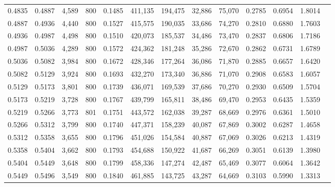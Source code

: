 \begin{tabular}{rrrrrrrrrrrrr}
0.4835 & 0.4887 &  4,589 &   800 &                                     0.1485 & 411,135 & 194,475 &  32,886 &  75,070 & 0.2785 & 0.6954 & 1.8014 \\
0.4887 & 0.4936 &  4,440 &   800 &                                     0.1527 & 415,575 & 190,035 &  33,686 &  74,270 & 0.2810 & 0.6880 & 1.7603 \\
0.4936 & 0.4987 &  4,498 &   800 &                                     0.1510 & 420,073 & 185,537 &  34,486 &  73,470 & 0.2837 & 0.6806 & 1.7186 \\
0.4987 & 0.5036 &  4,289 &   800 &                                     0.1572 & 424,362 & 181,248 &  35,286 &  72,670 & 0.2862 & 0.6731 & 1.6789 \\
0.5036 & 0.5082 &  3,984 &   800 &                                     0.1672 & 428,346 & 177,264 &  36,086 &  71,870 & 0.2885 & 0.6657 & 1.6420 \\
0.5082 & 0.5129 &  3,924 &   800 &                                     0.1693 & 432,270 & 173,340 &  36,886 &  71,070 & 0.2908 & 0.6583 & 1.6057 \\
0.5129 & 0.5173 &  3,801 &   800 &                                     0.1739 & 436,071 & 169,539 &  37,686 &  70,270 & 0.2930 & 0.6509 & 1.5704 \\
0.5173 & 0.5219 &  3,728 &   800 &                                     0.1767 & 439,799 & 165,811 &  38,486 &  69,470 & 0.2953 & 0.6435 & 1.5359 \\
0.5219 & 0.5266 &  3,773 &   801 &                                     0.1751 & 443,572 & 162,038 &  39,287 &  68,669 & 0.2976 & 0.6361 & 1.5010 \\
0.5266 & 0.5312 &  3,799 &   800 &                                     0.1740 & 447,371 & 158,239 &  40,087 &  67,869 & 0.3002 & 0.6287 & 1.4658 \\
0.5312 & 0.5358 &  3,655 &   800 &                                     0.1796 & 451,026 & 154,584 &  40,887 &  67,069 & 0.3026 & 0.6213 & 1.4319 \\
0.5358 & 0.5404 &  3,662 &   800 &                                     0.1793 & 454,688 & 150,922 &  41,687 &  66,269 & 0.3051 & 0.6139 & 1.3980 \\
0.5404 & 0.5449 &  3,648 &   800 &                                     0.1799 & 458,336 & 147,274 &  42,487 &  65,469 & 0.3077 & 0.6064 & 1.3642 \\
0.5449 & 0.5496 &  3,549 &   800 &                                     0.1840 & 461,885 & 143,725 &  43,287 &  64,669 & 0.3103 & 0.5990 & 1.3313 \\

\end{tabular}
